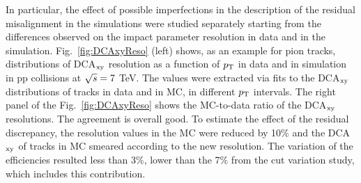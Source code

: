 In particular, the effect of possible imperfections in the description 
of the residual misalignment in the simulations were studied separately 
starting from the differences observed on the impact parameter resolution
in data and in the simulation.
Fig.~\ref{fig:DCAxyReso} (left) shows, as an example for pion tracks, distributions of
DCA$_{\rm xy}$ resolution as a function of $p_{\rm T}$ in data and in simulation 
in pp collisions at $\sqrt{s} = 7 $ TeV. The values were extracted via fits to the DCA$_{\rm xy}$ distributions
of tracks in data and in MC, in different $p_{\rm T}$ intervals. 
The right panel of the Fig.~\ref{fig:DCAxyReso} shows the 
MC-to-data ratio of the DCA$_{\rm xy}$ resolutions. 
The agreement is overall good. To estimate the effect of the residual discrepancy,
the resolution values in the MC were reduced by 10\% and the
DCA$_{\rm xy}$ of tracks in MC smeared according to the new resolution.
The variation of the efficiencies resulted less than 3\%, lower
than the 7\% from the cut variation study, which includes this contribution.

